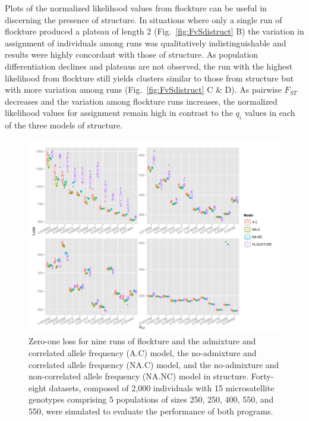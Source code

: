 Plots of the normalized likelihood values from {\sc flockture} can be useful in discerning the presence of 
structure.  In situations where only a single run of {\sc flockture} produced a plateau of length 2 
(Fig.~\ref{fig:FvSdistruct} B) the variation in assignment of individuals among runs was qualitatively indistinguishable
and results were highly concordant with those of {\sc structure}. As population differentiation declines 
and plateaus are not observed, the run with the highest likelihood from {\sc flockture} still yields
clusters similar to those from {\sc structure} but with more variation among runs (Fig.~\ref{fig:FvSdistruct} C \& D).
As pairwise $F_{ST}$ decreases and the variation among {\sc flockture} runs increases, the normalized likelihood
values for assignment remain high in contrast to the $q_i$ values in each of the three models of {\sc structure}. 

  \begin{figure}
\centering
\includegraphics[width=.9\linewidth]{images/Figures-Pat/uSatLoss.pdf}%
  \caption{Zero-one loss for nine runs of {\sc flockture} and the admixture and correlated allele 
  frequency (A.C) model, the no-admixture and correlated allele frequency (NA.C) model, 
and the no-admixture and non-correlated allele frequency (NA.NC) model in {\sc structure}. Forty-eight 
datasets, composed of 2,000 individuals with 15 microsatellite genotypes comprising
5 populations of sizes 250, 250, 400, 550, and 550, were simulated to evaluate the performance
of both programs. }
  \label{fig:uSatLoss}
\end{figure} 

